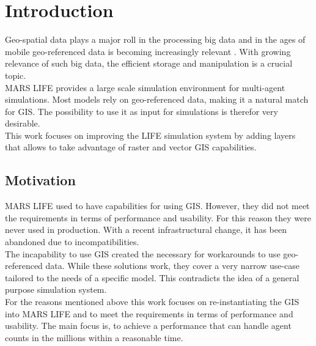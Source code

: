 
\chapter{Introduction}
Geo-spatial data plays a major roll in the processing big data and in the ages of mobile geo-referenced data is becoming increasingly relevant \citep{Lee2015, Kitchin2013, Graham2013}. With growing relevance of such big data, the efficient storage and manipulation is a crucial topic.\\
MARS LIFE provides a large scale simulation environment for multi-agent simulations. Most models rely on geo-referenced data, making it a natural match for GIS. The possibility to use it as input for simulations is therefor very desirable.\\
This work focuses on improving the LIFE simulation system by adding layers that allows to take advantage of raster and vector GIS capabilities.



\section{Motivation}
MARS LIFE used to have capabilities for using GIS. However, they did not meet the requirements in terms of performance and usability. For this reason they were never used in production. With a recent infrastructural change, it has been abandoned due to incompatibilities.\\
The incapability to use GIS created the necessary for workarounds to use geo-referenced data. While these solutions work, they cover a very narrow use-case tailored to the needs of a specific model. This contradicts the idea of a general purpose simulation system.\\
For the reasons mentioned above this work focuses on re-instantiating the GIS into MARS LIFE and to meet the requirements in terms of performance and usability. The main focus is, to achieve a performance that can handle agent counts in the millions within a reasonable time.
